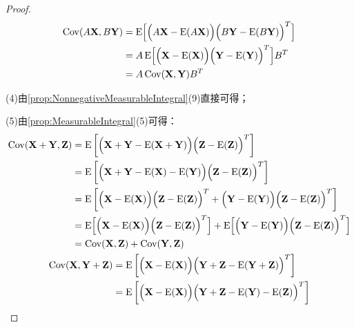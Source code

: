 \begin{proof}
	\begin{align*}
		\operatorname{Cov}(A\mathbf{X},B\mathbf{Y})
		&=\operatorname{E}\Bigl[\Bigl(A\mathbf{X}-\operatorname{E}(A\mathbf{X})\Bigr)\Bigl(B\mathbf{Y}-\operatorname{E}(B\mathbf{Y})\Bigr)^T\Bigr] \\
		&=A\operatorname{E}\Bigl[\Bigl(\mathbf{X}-\operatorname{E}(\mathbf{X})\Bigr)\Bigl(\mathbf{Y}-\operatorname{E}(\mathbf{Y})\Bigr)^T\Bigr]B^T \\
		&=A\operatorname{Cov}(\mathbf{X},\mathbf{Y})B^T
	\end{align*}\par
	(4)由\cref{prop:NonnegativeMeasurableIntegral}(9)直接可得；\par
	(5)由\cref{prop:MeasurableIntegral}(5)可得：
	\begin{gather*}
		\begin{aligned}
			\operatorname{Cov}(\mathbf{X}+\mathbf{Y},\mathbf{Z})
			&=\operatorname{E}\left[\Bigl(\mathbf{X}+\mathbf{Y}-\operatorname{E}(\mathbf{X}+\mathbf{Y})\Bigr)\Bigl(\mathbf{Z}-\operatorname{E}(\mathbf{Z})\Bigr)^T\right] \\
			&=\operatorname{E}\left[\Bigl(\mathbf{X}+\mathbf{Y}-\operatorname{E}(\mathbf{X})-\operatorname{E}(\mathbf{Y})\Bigr)\Bigl(\mathbf{Z}-\operatorname{E}(\mathbf{Z})\Bigr)^T\right] \\
			&=\operatorname{E}\left[\Bigl(\mathbf{X}-\operatorname{E}(\mathbf{X})\Bigr)\Bigl(\mathbf{Z}-\operatorname{E}(\mathbf{Z})\Bigr)^T+\Bigl(\mathbf{Y}-\operatorname{E}(\mathbf{Y})\Bigr)\Bigl(\mathbf{Z}-\operatorname{E}(\mathbf{Z})\Bigr)^T\right] \\
			&=\operatorname{E}\Bigl[\Bigl(\mathbf{X}-\operatorname{E}(\mathbf{X})\Bigr)\Bigl(\mathbf{Z}-\operatorname{E}(\mathbf{Z})\Bigr)^T\Bigr]+\operatorname{E}\Bigl[\Bigl(\mathbf{Y}-\operatorname{E}(\mathbf{Y})\Bigr)\Bigl(\mathbf{Z}-\operatorname{E}(\mathbf{Z})\Bigr)^T\Bigr] \\
			&=\operatorname{Cov}(\mathbf{X},\mathbf{Z})+\operatorname{Cov}(\mathbf{Y},\mathbf{Z})
		\end{aligned} \\
		\begin{aligned}
			\operatorname{Cov}(\mathbf{X},\mathbf{Y}+\mathbf{Z})
			&=\operatorname{E}\left[\Bigl(\mathbf{X}-\operatorname{E}(\mathbf{X})\Bigr)\Bigl(\mathbf{Y}+\mathbf{Z}-\operatorname{E}(\mathbf{Y}+\mathbf{Z})\Bigr)^T\right] \\
			&=\operatorname{E}\left[\Bigl(\mathbf{X}-\operatorname{E}(\mathbf{X})\Bigr)\Bigl(\mathbf{Y}+\mathbf{Z}-\operatorname{E}(\mathbf{Y})-\operatorname{E}(\mathbf{Z})\Bigr)^T\right] \\

\end{aligned}
\end{gather*}
\end{proof}
